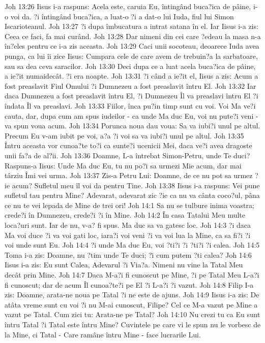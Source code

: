 Joh 13:26  Iisus i-a raspuns: Acela este, caruia Eu, întingând buca?ica de pâine, i-o voi da. ?i întingând buca?ica, a luat-o ?i a dat-o lui Iuda, fiul lui Simon Iscarioteanul.
Joh 13:27  ?i dupa îmbucatura a intrat satana în el. Iar Iisus i-a zis: Ceea ce faci, fa mai curând.
Joh 13:28  Dar nimeni din cei care ?edeau la masa n-a în?eles pentru ce i-a zis aceasta.
Joh 13:29  Caci unii socoteau, deoarece Iuda avea punga, ca lui îi zice Iisus: Cumpara cele de care avem de trebuin?a la sarbatoare, sau sa dea ceva saracilor.
Joh 13:30  Deci dupa ce a luat acela buca?ica de pâine, a ie?it numaidecât. ?i era noapte.
Joh 13:31  ?i când a ie?it el, Iisus a zis: Acum a fost preaslavit Fiul Omului ?i Dumnezeu a fost preaslavit întru El.
Joh 13:32  Iar daca Dumnezeu a fost preaslavit întru El, ?i Dumnezeu Îl va preaslavi întru El ?i îndata Îl va preaslavi.
Joh 13:33  Fiilor, înca pu?in timp sunt cu voi. Voi Ma ve?i cauta, dar, dupa cum am spus iudeilor - ca unde Ma duc Eu, voi nu pute?i veni - va spun voua acum.
Joh 13:34  Porunca noua dau voua: Sa va iubi?i unul pe altul. Precum Eu v-am iubit pe voi, a?a ?i voi sa va iubi?i unul pe altul.
Joh 13:35  Întru aceasta vor cunoa?te to?i ca sunte?i ucenicii Mei, daca ve?i avea dragoste unii fa?a de al?ii.
Joh 13:36  Doamne, L-a întrebat Simon-Petru, unde Te duci? Raspuns-a Iisus: Unde Ma duc Eu, tu nu po?i sa urmezi Mie acum, dar mai târziu Îmi vei urma.
Joh 13:37  Zis-a Petru Lui: Doamne, de ce nu pot sa urmez ?ie acum? Sufletul meu îl voi da pentru Tine.
Joh 13:38  Iisus i-a raspuns: Vei pune sufletul tau pentru Mine? Adevarat, adevarat zic ?ie ca nu va cânta coco?ul, pâna ce nu te vei lepada de Mine de trei ori!
Joh 14:1  Sa nu se tulbure inima voastra; crede?i în Dumnezeu, crede?i ?i în Mine.
Joh 14:2  În casa Tatalui Meu multe loca?uri sunt. Iar de nu, v-a? fi spus. Ma duc sa va gatesc loc.
Joh 14:3  ?i daca Ma voi duce ?i va voi gati loc, iara?i voi veni ?i va voi lua la Mine, ca sa fi?i ?i voi unde sunt Eu.
Joh 14:4  ?i unde Ma duc Eu, voi ?ti?i ?i ?ti?i ?i calea.
Joh 14:5  Toma i-a zis: Doamne, nu ?tim unde Te duci; ?i cum putem ?ti calea?
Joh 14:6  Iisus i-a zis: Eu sunt Calea, Adevarul ?i Via?a. Nimeni nu vine la Tatal Meu decât prin Mine.
Joh 14:7  Daca M-a?i fi cunoscut pe Mine, ?i pe Tatal Meu L-a?i fi cunoscut; dar de acum Îl cunoa?te?i pe El ?i L-a?i ?i vazut.
Joh 14:8  Filip I-a zis: Doamne, arata-ne noua pe Tatal ?i ne este de ajuns.
Joh 14:9  Iisus i-a zis: De atâta vreme sunt cu voi ?i nu M-ai cunoscut, Filipe? Cel ce M-a vazut pe Mine a vazut pe Tatal. Cum zici tu: Arata-ne pe Tatal?
Joh 14:10  Nu crezi tu ca Eu sunt întru Tatal ?i Tatal este întru Mine? Cuvintele pe care vi le spun nu le vorbesc de la Mine, ci Tatal - Care ramâne întru Mine - face lucrarile Lui.
